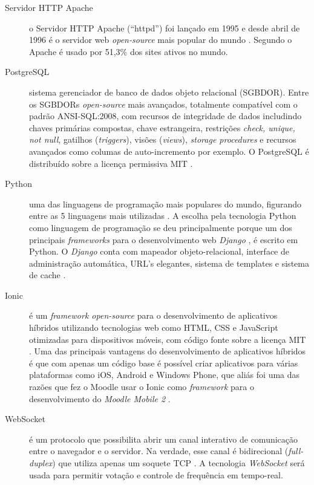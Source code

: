 \begin{description}
  \item[Servidor HTTP Apache]
  o Servidor HTTP Apache (``httpd'') foi lançado em 1995 e desde abril de 1996 é o
  servidor web \textit{open-source} mais popular do mundo \cite{apache2016}.
  Segundo  o Apache é usado por 51,3\% dos sites ativos no mundo.

  \item[PostgreSQL] sistema gerenciador de banco de dados objeto relacional (SGBDOR).
  Entre os SGBDORs \textit{open-source} mais avançados, totalmente compatível com
  o padrão ANSI-SQL:2008, com recursos de integridade de dados includindo chaves
  primárias compostas, chave estrangeira, restrições \textit{check, unique, not null},
  gatilhos (\textit{triggers}), visões (\textit{views}), \textit{storage procedures}
  e recursos avançados como columas de auto-incremento por exemplo.
  O PostgreSQL é distribuído sobre a licença permissiva MIT \cite{postgree2016}.

  \item[Python] uma das linguagens de programação mais populares do mundo,
  figurando entre as 5 linguagens mais utilizadas \cite{TIOBE2016, RedMonk2016, PYPL2016}.
  A escolha pela tecnologia Python como linguagem de programação se deu principalmente
  porque um dos principais \textit{frameworks} para o desenvolvimento web \textit{Django} \cite{Django2016},
  é escrito em Python. O \textit{Django} conta com mapeador objeto-relacional,
  interface de administração automática, URL's elegantes, sistema de templates e
  sistema de cache \cite{Django2016}.

  \item[Ionic] é um \textit{framework open-source} para o desenvolvimento de aplicativos
  híbridos utilizando tecnologias web como HTML, CSS e JavaScript otimizadas
  para dispositivos móveis, com código fonte sobre a licença MIT \cite{ionic2016}.
  Uma das principais vantagens do desenvolvimento de aplicativos híbridos é que com
  apenas um código base é possível criar aplicativos para várias plataformas como
  iOS, Android e Windows Phone, que aliás foi uma das razões que fez o Moodle
  usar o Ionic como \textit{framework} para o desenvolvimento do \textit{Moodle Mobile 2} \cite{moodle2016}.

  \item[WebSocket] é um protocolo que possibilita abrir um canal interativo de comunicação
  entre o navegador e o servidor. Na verdade, esse canal é bidirecional (\textit{full-duplex})
  que utiliza apenas um soquete TCP \cite{websocket2016}. A tecnologia \textit{WebSocket} será usada
  para permitir votação e controle de frequência em tempo-real.
\end{description}

